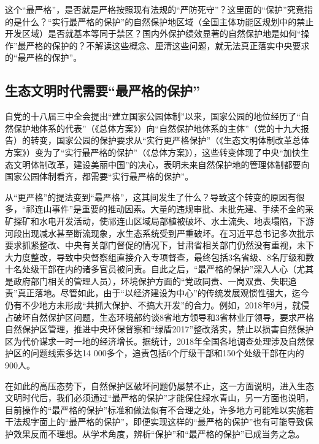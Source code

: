 \documentclass[
]{book}
\begin{document}
这个``最严格''，是否就是严格按照现有法规的``严防死守''？这里面的``保护''究竟指的是什么？``实行最严格的保护''的自然保护地区域（全国主体功能区规划中的禁止开发区域）是否就基本等同于禁区？国内外保护绩效显著的自然保护地是如何``操作''最严格的保护的？不解读这些概念、厘清这些问题，就无法真正落实中央要求的``最严格的保护''。

\hypertarget{ux751fux6001ux6587ux660eux65f6ux4ee3ux9700ux8981ux6700ux4e25ux683cux7684ux4fddux62a4}{%
\subsection{生态文明时代需要``最严格的保护''}\label{ux751fux6001ux6587ux660eux65f6ux4ee3ux9700ux8981ux6700ux4e25ux683cux7684ux4fddux62a4}}

自党的十八届三中全会提出``建立国家公园体制''以来，国家公园的地位经历了``自然保护地体系的代表''（《总体方案》）向``自然保护地体系的主体''（党的十九大报告）的转变，国家公园的保护要求从``实行更严格保护''（《生态文明体制改革总体方案》）变为了``实行最严格的保护''（《总体方案》），这些转变体现了中央``加快生态文明体制改革，建设美丽中国''的决心，表明未来自然保护地的管理体制都要向国家公园体制看齐，都需要``实行最严格的保护''。

从``更严格''的提法变到``最严格''，这其间发生了什么？导致这个转变的原因有很多，``祁连山事件''是重要的推动因素。大量的违规审批、未批先建、手续不全的采矿探矿和水电开发活动，使祁连山区域局部植被破坏、水土流失、地表塌陷，下游河段出现减水甚至断流现象，水生态系统受到严重破坏。在习近平总书记多次批示要求抓紧整改、中央有关部门督促的情况下，甘肃省相关部门仍然没有重视，未下大力度整改，导致中央督察组直接介入专项督查，最终包括3名省级、8名厅级和数十名处级干部在内的诸多官员被问责。自此之后，``最严格的保护''深入人心（尤其是政府部门相关的管理人员），环境保护方面的``党政同责、一岗双责、失职追责''真正落地。尽管如此，由于``以经济建设为中心''的传统发展观惯性强大，迄今仍有不少地方未形成``共抓大保护、不搞大开发''的合力。例如，2018年9月，就侵占破坏自然保护区问题，生态环境部约谈8省地方领导和3省林业厅领导，要求严格自然保护区管理，推进中央环保督察和``绿盾2017''整改落实，禁止以损害自然保护区为代价谋求一时一地的经济增长。据统计，2018年全国各地调查处理涉及自然保护区的问题线索多达14 000多个，追责包括6个厅级干部和150个处级干部在内的900人。

在如此的高压态势下，自然保护区破坏问题仍屡禁不止，这一方面说明，进入生态文明时代后，我们必须通过``最严格的保护''才能保住绿水青山，另一方面也说明，目前操作的``最严格的保护''标准和做法似有不合理之处，许多地方可能难以实施若干法规字面上的``最严格的保护''，即便实现这样的``最严格的保护''也有可能导致保护效果反而不理想。从学术角度，辨析``保护''和``最严格的保护''已成当务之急。
\end{document}
